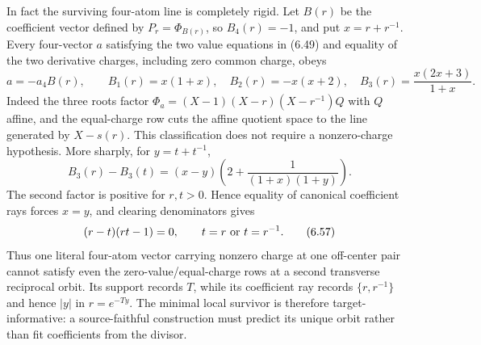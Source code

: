 \documentclass[11pt]{article}
\theoremstyle{definition}
\theoremstyle{remark}
\begin{document}
In fact the surviving four-atom line is completely rigid.  Let $B(r)$ be the coefficient vector
defined by $P_r=\Phi_{B(r)}$, so $B_4(r)=-1$, and put $x=r+r^{-1}$.  Every four-vector $a$
satisfying the two value equations in (6.49) and equality of the two derivative charges,
including zero common charge, obeys
\[
 a=-a_4B(r),\qquad
 B_1(r)=x(1+x),\quad B_2(r)=-x(x+2),\quad
 B_3(r)=\frac{x(2x+3)}{1+x}.                           \tag{6.55}
\]
Indeed the three roots factor $\Phi_a=(X-1)(X-r)(X-r^{-1})Q$ with $Q$ affine, and the equal-charge
row cuts the affine quotient space to the line generated by $X-s(r)$.  This classification does
not require a nonzero-charge hypothesis.  More sharply, for $y=t+t^{-1}$,
\[
 B_3(r)-B_3(t)
 =(x-y)\left(2+\frac1{(1+x)(1+y)}\right).              \tag{6.56}
\]
The second factor is positive for $r,t>0$.  Hence equality of canonical coefficient rays forces
$x=y$, and clearing denominators gives
\[
 (r-t)(rt-1)=0,\qquad t=r\ \hbox{or}\ t=r^{-1}.         \tag{6.57}
\]
Thus one literal four-atom vector carrying nonzero charge at one off-center pair cannot satisfy
even the zero-value/equal-charge rows at a second transverse reciprocal orbit.  Its support
records $T$, while its coefficient ray records $\{r,r^{-1}\}$ and hence $|y|$ in
$r=e^{-Ty}$.  The minimal local survivor is therefore target-informative: a source-faithful
construction must predict its unique orbit rather than fit coefficients from the divisor.
\end{document}
